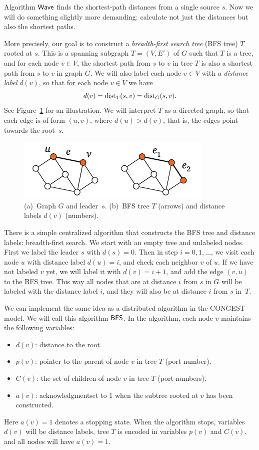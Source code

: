 Algorithm $\textup{\sffamily Wave}$ finds the shortest-path distances from a single source $s$. Now we will do something slightly more demanding: calculate not just the distances but also the shortest paths.

More precisely, our goal is to construct a \emph{breadth-first search tree} (BFS tree) $T$ rooted at $s$. This is a spanning subgraph $T = (V,E')$ of $G$ such that $T$ is a tree, and for each node $v \in V$, the shortest path from $s$ to $v$ in tree $T$ is also a shortest path from $s$ to $v$ in graph $G$. We will also label each node $v \in V$ with a \emph{distance label} $d(v)$, so that for each node $v \in V$ we have
\[
    d(v) = \operatorname{dist}_T(s,v) = \operatorname{dist}_G(s,v).
\]
See Figure~\ref{fig:bfs} for an illustration. We will interpret $T$ as a directed graph, so that each edge is of form $(u,v)$, where $d(u) > d(v)$, that is, the edges point towards the root~$s$.

\begin{figure}
    \centering
    \includegraphics[page=\PBFS]{figs.pdf}
    \caption{(a)~Graph $G$ and leader~$s$. (b)~BFS tree $T$ (arrows) and distance labels $d(v)$ (numbers).}\label{fig:bfs}
\end{figure}

There is a simple centralized algorithm that constructs the BFS tree and distance labels: breadth-first search. We start with an empty tree and unlabeled nodes. First we label the leader $s$ with $d(s) = 0$. Then in step $i = 0, 1, \dotsc$, we visit each node $u$ with distance label $d(u) = i$, and check each neighbor $v$ of $u$. If we have not labeled $v$ yet, we will label it with $d(v) = i+1$, and add the edge $(v,u)$ to the BFS tree. This way all nodes that are at distance $i$ from $s$ in $G$ will be labeled with the distance label $i$, and they will also be at distance $i$ from $s$ in~$T$.

We can implement the same idea as a distributed algorithm in the CONGEST model. We will call this algorithm $\textup{\sffamily BFS}$. In the algorithm, each node $v$ maintains the following variables:
\begin{itemize}
    \item $d(v)$: distance to the root.
    \item $p(v)$: pointer to the parent of node $v$ in tree $T$ (port number).
    \item $C(v)$: the set of children of node $v$ in tree $T$ (port numbers).
    \item $a(v)$: acknowledgment\mydash set to $1$ when the subtree rooted at $v$ has been constructed.
\end{itemize}
Here $a(v) = 1$ denotes a stopping state. When the algorithm stops, variables $d(v)$ will be distance labels, tree $T$ is encoded in variables $p(v)$ and $C(v)$, and all nodes will have $a(v) = 1$.

